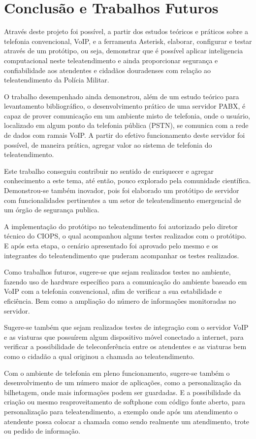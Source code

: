 
\chapter{Conclusão e Trabalhos Futuros} %
Através deste projeto foi possível, a partir dos estudos teóricos e práticos sobre a telefonia convencional, VoIP, e a ferramenta Asterisk, elaborar, configurar e testar através de um protótipo, ou seja, demonstrar que é possível aplicar inteligencia computacional neste teleatendimento e ainda proporcionar segurança e confiabilidade aos atendentes e cidadãos douradenses com relação ao teleatendimento da Polícia Militar.

O trabalho desempenhado ainda demonstrou, além de um estudo teórico para levantamento bibliográfico, o desenvolvimento prático de uma servidor PABX, é capaz de prover comunicação em um ambiente misto de telefonia, onde o usuário, localizado em algum ponto da telefonia pública (PSTN), se comunica com a rede de dados com ramais VoIP. A partir do efetivo funcionamento deste servidor foi possível, de maneira prática, agregar valor ao sistema de telefonia do teleatendimento.

Este trabalho conseguiu contribuir no sentido de enriquecer e agregar conhecimento a este tema, até então, pouco explorado pela comunidade científica. Demonstrou-se também inovador, pois foi elaborado um protótipo de servidor com funcionalidades pertinentes a um setor de teleatendimento emergencial de um órgão de segurança publica.

A implementação do protótipo no teleatendimento foi autorizado pelo diretor técnico do CIOPS, o qual acompanhou alguns testes realizados com o protótipo. E após esta etapa, o cenário apresentado foi aprovado pelo mesmo e os integrantes do teleatendimento que puderam acompanhar os testes realizados.

Como trabalhos futuros, sugere-se que sejam realizados testes no ambiente, fazendo uso de hardware específico para a comunicação do ambiente baseado em VoIP com a telefonia convencional, afim de verificar a sua estabilidade e eficiência. Bem como a ampliação do número de informações monitoradas no servidor.

Sugere-se também que sejam realizados testes de integração com o servidor VoIP e as viaturas que possuírem algum dispositivo móvel conectado a internet, para verificar a possibilidade de teleconferência entre os atendentes e as viaturas bem como o cidadão a qual originou a chamada ao teleatendimento.

Com o ambiente de telefonia em pleno funcionamento, sugere-se também o desenvolvimento de um número maior de aplicações, como a personalização da bilhetagem, onde mais informações podem ser guardadas. E a possibilidade da criação ou mesmo reaproveitamento de softphone com código fonte aberto, para personalização para teleatendimento, a exemplo onde após um atendimento o atendente possa colocar a chamada como sendo realmente um atendimento, trote ou pedido de informação.

